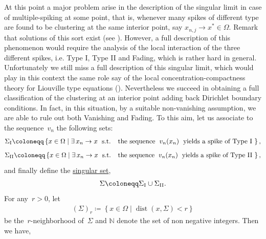 \documentclass[10pt]{amsart}
\newcommand{\braces}[1]{\left\{#1\right\}} %
\DeclareMathOperator{\dist}{dist}
\def\N{\mathbb{N}}
\renewcommand{\to}{\rightarrow}
\newcommand{\un}[1]{\underline{#1}}
\begin{document}
At this point a major problem arise in the description of the singular limit in case of multiple-spiking at some point, that is,
whenever many spikes of different type are found to
be clustering at the same interior point, say $x_{n,j}\to x^*\in\Omega$. Remark that solutions of this sort exist (see \cite{DY}).
However, a full description of this phenomenon would require the analysis of the local
interaction of the three different spikes, i.e. Type I, Type II and Fading, which is rather hard in general. Unfortunately we still miss a
full description of this singular limit, which would play in this context the same role say of the local concentration-compactness theory for Liouville
type equations (\cite{bm,ls}).
Nevertheless we succeed in obtaining a full classification of the clustering
at an interior point adding back Dirichlet boundary conditions. In fact, in this situation, by a suitable non-vanishing assumption, we are able to rule out
both Vanishing and Fading. To this aim, let us associate to the sequence~$v_n$ the following sets:
    \begin{align*}
        \Sigma_{\rm I}\coloneqq \braces{x\in\Omega \mid \exists\, x_{n}\to x\; \mbox{ s.t. } \; \mbox{ the sequence }\;
        v_n(x_n)\; \mbox{ yields a spike of Type I }},
    \end{align*}
    \begin{align*}
        \Sigma_{\rm II}\coloneqq \braces{x\in\Omega \mid \exists\, x_{n}\to x\; \mbox{ s.t. } \; \mbox{ the sequence }\;
        v_n(x_n)\; \mbox{ yields a spike of Type II }},
    \end{align*}
    and finally define the \un{singular set},
    \begin{align*}
        \Sigma\coloneqq \Sigma_{\rm I} \cup \Sigma_{\rm II}.
    \end{align*}
    For any~$r>0$, let
    \begin{align*}
        (\Sigma)_r\coloneqq \braces{x\in\Omega\mid \dist(x,\Sigma)<r}
    \end{align*}
    be the~$r$-neighborhood of~$\Sigma$ and $\N$ denote the set of non negative integers.  Then we have,
\end{document}
